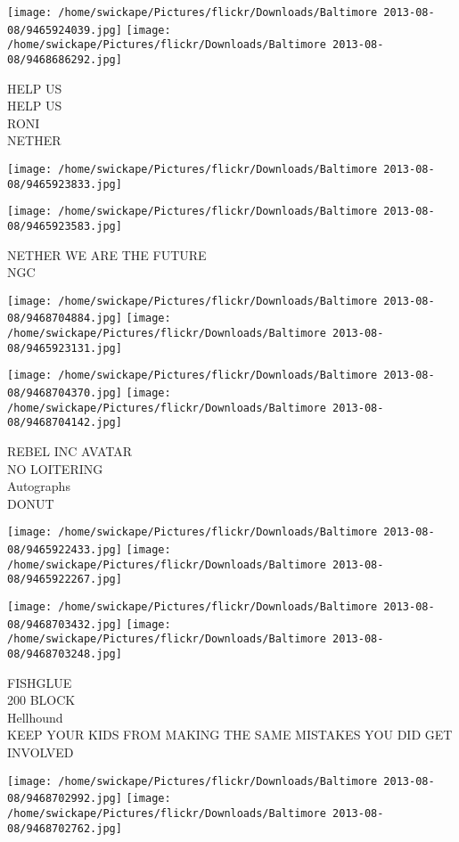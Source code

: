 \documentclass[10pt,letterpaper]{article}
\begin{document}
\texttt{[image: /home/swickape/Pictures/flickr/Downloads/Baltimore 2013-08-08/9465924039.jpg]}
\texttt{[image: /home/swickape/Pictures/flickr/Downloads/Baltimore 2013-08-08/9468686292.jpg]}

HELP US\\
HELP US\\
RONI\\
NETHER
\pagebreak

\texttt{[image: /home/swickape/Pictures/flickr/Downloads/Baltimore 2013-08-08/9465923833.jpg]}

\vspace{0.25in}
\texttt{[image: /home/swickape/Pictures/flickr/Downloads/Baltimore 2013-08-08/9465923583.jpg]}

NETHER WE ARE THE FUTURE\\
NGC
\pagebreak

\texttt{[image: /home/swickape/Pictures/flickr/Downloads/Baltimore 2013-08-08/9468704884.jpg]}
\texttt{[image: /home/swickape/Pictures/flickr/Downloads/Baltimore 2013-08-08/9465923131.jpg]}

\texttt{[image: /home/swickape/Pictures/flickr/Downloads/Baltimore 2013-08-08/9468704370.jpg]}
\texttt{[image: /home/swickape/Pictures/flickr/Downloads/Baltimore 2013-08-08/9468704142.jpg]}

REBEL INC AVATAR\\
NO LOITERING\\
Autographs\\
DONUT
\pagebreak

\texttt{[image: /home/swickape/Pictures/flickr/Downloads/Baltimore 2013-08-08/9465922433.jpg]}
\texttt{[image: /home/swickape/Pictures/flickr/Downloads/Baltimore 2013-08-08/9465922267.jpg]}

\texttt{[image: /home/swickape/Pictures/flickr/Downloads/Baltimore 2013-08-08/9468703432.jpg]}
\texttt{[image: /home/swickape/Pictures/flickr/Downloads/Baltimore 2013-08-08/9468703248.jpg]}

FISHGLUE\\
200 BLOCK\\
Hellhound\\
KEEP YOUR KIDS FROM MAKING THE SAME MISTAKES YOU DID GET INVOLVED
\pagebreak

\texttt{[image: /home/swickape/Pictures/flickr/Downloads/Baltimore 2013-08-08/9468702992.jpg]}
\texttt{[image: /home/swickape/Pictures/flickr/Downloads/Baltimore 2013-08-08/9468702762.jpg]}
\end{document}
